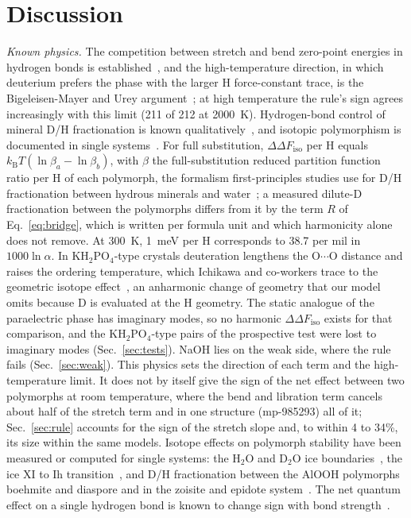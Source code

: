 \documentclass[aps,prmaterials,reprint,superscriptaddress,nofootinbib]{revtex4-2}
\newcommand{\ddF}{\Delta\Delta F_{\mathrm{iso}}}
\begin{document}
\section{Discussion}
\label{sec:discussion}

\textit{Known physics.} The competition between stretch and bend zero-point energies in hydrogen bonds is established~\cite{McKenzie2014,McKenzie2015,Li2011,Markland2012}, and the high-temperature direction, in which deuterium prefers the phase with the larger H force-constant trace, is the Bigeleisen-Mayer and Urey argument~\cite{Bigeleisen1947,Urey1947}; at high temperature the rule's sign agrees increasingly with this limit (211 of 212 at 2000~K). Hydrogen-bond control of mineral D/H fractionation is known qualitatively~\cite{Suzuoki1976,Meheut2010}, and isotopic polymorphism is documented in single systems~\cite{Crawford2009,Zhou2004,Zhou2006,Ip2012,Falk2018,Shi2018,Ford2011,Merz2015}. For full substitution, $\ddF$ per H equals $k_{\mathrm{B}}T(\ln\beta_a-\ln\beta_b)$, with $\beta$ the full-substitution reduced partition function ratio per H of each polymorph, the formalism first-principles studies use for D/H fractionation between hydrous minerals and water~\cite{Meheut2010,Reynard2009}; a measured dilute-D fractionation between the polymorphs differs from it by the term $R$ of Eq.~\eqref{eq:bridge}, which is written per formula unit and which harmonicity alone does not remove. At 300~K, 1~meV per H corresponds to 38.7 per mil in $1000\ln\alpha$. In KH$_2$PO$_4$-type crystals deuteration lengthens the O$\cdots$O distance and raises the ordering temperature, which Ichikawa and co-workers trace to the geometric isotope effect~\cite{Ichikawa1978,Ichikawa1987}, an anharmonic change of geometry that our model omits because D is evaluated at the H geometry. The static analogue of the paraelectric phase has imaginary modes, so no harmonic $\ddF$ exists for that comparison, and the KH$_2$PO$_4$-type pairs of the prospective test were lost to imaginary modes (Sec.~\ref{sec:tests}). NaOH lies on the weak side, where the rule fails (Sec.~\ref{sec:weak}). This physics sets the direction of each term and the high-temperature limit. It does not by itself give the sign of the net effect between two polymorphs at room temperature, where the bend and libration term cancels about half of the stretch term and in one structure (mp-985293) all of it; Sec.~\ref{sec:rule} accounts for the sign of the stretch slope and, to within 4 to 34\%, its size within the same models. Isotope effects on polymorph stability have been measured or computed for single systems: the H$_2$O and D$_2$O ice boundaries~\cite{Bridgman1935,Herrig2018}, the ice XI to Ih transition~\cite{Pamuk2015}, and D/H fractionation between the AlOOH polymorphs boehmite and diaspore and in the zoisite and epidote system~\cite{Graham1980}. The net quantum effect on a single hydrogen bond is known to change sign with bond strength~\cite{Li2011,McKenzie2014}. 
\end{document}
